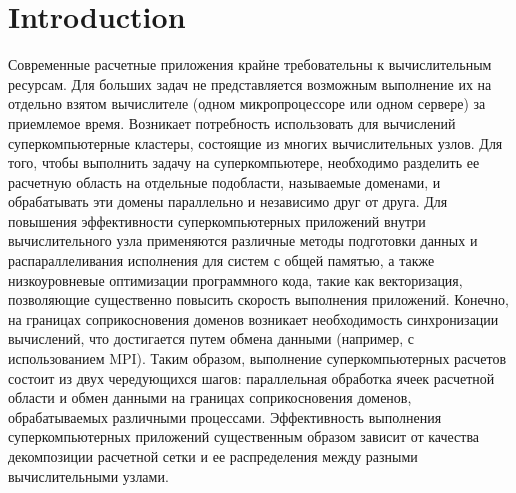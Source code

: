 \documentclass[
11pt,%
tightenlines,%
twoside,%
onecolumn,%
nofloats,%
nobibnotes,%
nofootinbib,%
superscriptaddress,%
noshowpacs,%
centertags]%
{revtex4}
\begin{document}
\section{Introduction}

Современные расчетные приложения крайне требовательны к вычислительным ресурсам.
Для больших задач не представляется возможным выполнение их на отдельно взятом вычислителе (одном микропроцессоре или одном сервере) за приемлемое время.
Возникает потребность использовать для вычислений суперкомпьютерные кластеры, состоящие из многих вычислительных узлов.
Для того, чтобы выполнить задачу на суперкомпьютере, необходимо разделить ее расчетную область на отдельные подобласти, называемые доменами, и обрабатывать эти домены параллельно и независимо друг от друга.
Для повышения эффективности суперкомпьютерных приложений внутри вычислительного узла применяются различные методы подготовки данных и распараллеливания исполнения для систем с общей памятью, а также низкоуровневые оптимизации программного кода, такие как векторизация, позволяющие существенно повысить скорость выполнения приложений.
Конечно, на границах соприкосновения доменов возникает необходимость синхронизации вычислений, что достигается путем обмена данными (например, с использованием MPI).
Таким образом, выполнение суперкомпьютерных расчетов состоит из двух чередующихся шагов: параллельная обработка ячеек расчетной области и обмен данными на границах соприкосновения доменов, обрабатываемых различными процессами.
Эффективность выполнения суперкомпьютерных приложений существенным образом зависит от качества декомпозиции расчетной сетки и ее распределения между разными вычислительными узлами.
\end{document}
